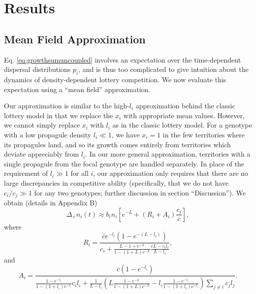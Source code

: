 \documentclass[11pt]{article}
\begin{document}
\section*{Results}

\subsection*{Mean Field Approximation}

Eq. \eqref{eq:growthsumuncoupled} involves an expectation over the time-dependent dispersal distributions $p_i$, and is thus too complicated to give intuition about the dynamics of density-dependent lottery competition. We now evaluate this expectation using a ``mean field'' approximation. 

Our approximation is similar to the high-$l_i$ approximation behind the classic lottery model in that we replace the $x_i$ with appropriate mean values. However, we cannot simply replace $x_i$ with $l_i$ as in the classic lottery model. For a genotype with a low propagule density $l_i\ll 1$, we have $x_i=1$ in the few territories where its propagules land, and so its growth comes entirely from territories which deviate appreciably from $l_i$. In our more general approximation, territories with a single propagule from the focal genotype are handled separately. In place of the requirement of $l_i\gg 1$ for all $i$, our approximation only requires that there are no large discrepancies in competitive ability (specifically, that we do not have $c_i/c_j\gg 1$ for any two genotypes; further discussion in section ``Discussion''). We obtain (details in Appendix B)
\begin{equation}
\Delta_+ n_i(t)\approx b_i n_i\left[e^{-L}+(R_i+A_i)\frac{c_i}{\overline{c}}\right], \label{eq:master}
\end{equation}
where
\begin{equation}
R_i=\frac{\overline{c}e^{-l_i}(1-e^{-(L-l_i)})}{c_i +\frac{L-1+e^{-L}}{1-(1+L)e^{-L}}\frac{\overline{c}L- c_il_i}{L-l_i}},\label{eq:Dr}
\end{equation}
and
\begin{equation}
A_i=\frac{\overline{c}(1-e^{-l_i})}{\frac{1-e^{-l_i}}{1-(1+l_i)e^{-l_i}}c_il_i+\frac{1}{L-l_i}\left(L\frac{1-e^{-L}}{1-(1+L)e^{-L}}-l_i\frac{1-e^{-l_i}}{1-(1+l_i)e^{-l_i}}\right)\sum_{j\neq i}c_jl_j}.\label{eq:Da}
\end{equation}
\end{document}
